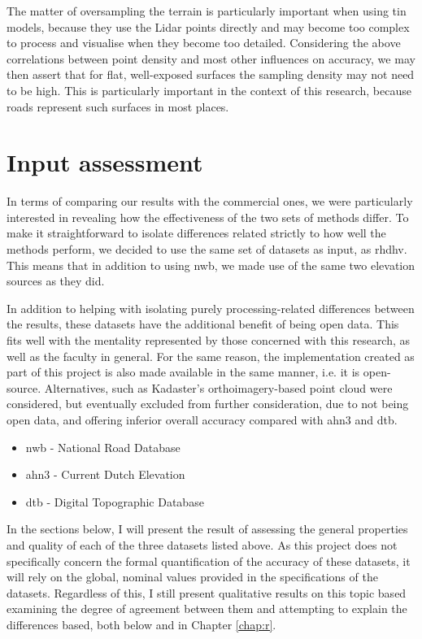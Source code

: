 The matter of oversampling the terrain is particularly important when using \ac{tin} models, because they use the Lidar points directly and may become too complex to process and visualise when they become too detailed. Considering the above correlations between point density and most other influences on accuracy, we may then assert that for flat, well-exposed surfaces the sampling density may not need to be high. This is particularly important in the context of this research, because roads represent such surfaces in most places.

\section{Input assessment}
\label{sec:input}

In terms of comparing our results with the commercial ones, we were particularly interested in revealing how the effectiveness of the two sets of methods differ. To make it straightforward to isolate differences related strictly to how well the methods perform, we decided to use the same set of datasets as input, as \ac{rhdhv}. This means that in addition to using \ac{nwb}, we made use of the same two elevation sources as they did.

In addition to helping with isolating purely processing-related differences between the results, these datasets have the additional benefit of being open data. This fits well with the mentality represented by those concerned with this research, as well as the faculty in general. For the same reason, the implementation created as part of this project is also made available in the same manner, i.e. it is open-source. Alternatives, such as Kadaster's orthoimagery-based point cloud were considered, but eventually excluded from further consideration, due to not being open data, and offering inferior overall accuracy compared with \ac{ahn3} and \ac{dtb}.

\begin{itemize}
\item \ac{nwb} - National Road Database
\item \ac{ahn3} - Current Dutch Elevation
\item \ac{dtb} - Digital Topographic Database
\end{itemize}

In the sections below, I will present the result of assessing the general properties and quality of each of the three datasets listed above. As this project does not specifically concern the formal quantification of the accuracy of these datasets, it will rely on the global, nominal values provided in the specifications of the datasets. Regardless of this, I still present qualitative results on this topic based examining the degree of agreement between them and attempting to explain the differences based, both below and in Chapter \ref{chap:r}.

